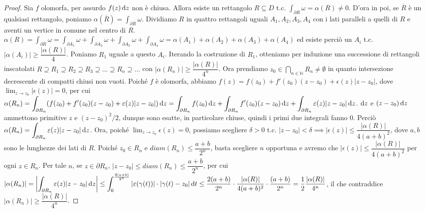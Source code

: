 \begin{proof}
  Sia $f$ olomorfa, per assurdo $f(z)\mathop{}\!\mathrm{d} z$ non è chiusa. Allora esiste un rettangolo $R \subseteq D$ t.c. $\displaystyle \int_{\partial R} \omega=\alpha(R)\not=0$. D'ora in poi, se $\overline{R}$ è un qualsiasi rettangolo, poniamo $\alpha(\overline{R})=\int_{\partial \overline{R}} \omega$. Dividiamo $R$ in quattro rettangoli uguali $A_1, A_2, A_3, A_4$ con i lati paralleli a quelli di $R$ e aventi un vertice in comune nel centro di $R$.
  $\displaystyle \alpha(R)=\int_{\partial R} \omega=\int_{\partial A_1} \omega+\int_{\partial A_2} \omega+\int_{\partial A_3} \omega+\int_{\partial A_4} \omega=\alpha(A_1)+\alpha(A_2)+\alpha(A_3)+\alpha(A_4)$ ed esiste perciò un $A_i$ t.c. $|\alpha(A_i)|\ge \dfrac{|\alpha(R)|}{4}$.
  Poniamo $R_1$ uguale a questo $A_i$. Iterando la costruzione di $R_1$, otteniamo per induzione una successione di rettangoli inscatolati $R \supseteq R_1 \supseteq R_2 \supseteq R_3 \supseteq \dots \supseteq R_n \supseteq \dots$ con $|\alpha(R_n)|\ge \dfrac{|\alpha(R)|}{4^n}$. Ora prendiamo $\displaystyle z_0 \in \bigcap_{n \in \mathbb{N}} R_n \not=\emptyset$ in quanto intersezione decrescente di compatti chiusi non vuoti.
  Poiché $f$ è olomorfa, abbiamo $f(z)=f(z_0)+f'(z_0)(z-z_0)+\epsilon(z)|z-z_0|$, dove $\displaystyle \lim_{z \longrightarrow z_0} |\epsilon(z)|=0$, per cui $\displaystyle \alpha(R_n)=\int_{\partial R_n} (f(z_0)+f'(z_0)(z-z_0)+\varepsilon(z)|z-z_0|)\mathop{}\!\mathrm{d} z=\int_{\partial R_n} f(z_0)\mathop{}\!\mathrm{d} z+\int_{\partial R_n} f'(z_0)(z-z_0)\mathop{}\!\mathrm{d} z+\int_{\partial R_n} \varepsilon(z)|z-z_0|\mathop{}\!\mathrm{d} z$.
  $\mathop{}\!\mathrm{d} z$ e $(z-z_0)\mathop{}\!\mathrm{d} z$ ammettono primitive $z$ e $(z-z_0)^2/2$, dunque sono esatte, in particolare chiuse, quindi i primi due integrali fanno $0$. Perciò $\displaystyle \alpha(R_n)=\int_{\partial R_n} \varepsilon(z)|z-z_0|\mathop{}\!\mathrm{d} z$.
  Ora, poiché $\displaystyle \lim_{z \longrightarrow z_0} \epsilon(z)=0$, possiamo scegliere $\delta>0$ t.c. $|z-z_0|<\delta \implies |\epsilon(z)|\le \dfrac{|\alpha(R)|}{4(a+b)^2}$, dove $a, b$ sono le lunghezze dei lati di $R$.
  Poiché $z_0 \in R_n$ e $diam(R_n) \le \dfrac{a+b}{2^n}$, basta scegliere $n$ opportuna e avremo che $|\epsilon(z)|\le \dfrac{|\alpha(R)|}{4(a+b)^2}$ per ogni $z \in R_n$.
  Per tale $n$, se $z \in \partial R_n$, $|z-z_0| \le diam(R_n) \le \dfrac{a+b}{2^n}$, per cui $\displaystyle |\alpha(R_n)|=\left|\int_{\partial R_n} \varepsilon(z)|z-z_0|\mathop{}\!\mathrm{d} z\right|\le\int_0^{\frac{2(a+b)}{2^n}} |\varepsilon(\gamma(t))|\cdot|\gamma(t)-z_0|\mathop{}\!\mathrm{d} t \le \dfrac{2(a+b)}{2^n}\cdot\dfrac{|\alpha(R)|}{4(a+b)^2}\cdot\dfrac{(a+b)}{2^n}=\dfrac{1}{2}\dfrac{|\alpha(R)|}{4^n}$, il che contraddice $|\alpha(R_n)| \ge \dfrac{|\alpha(R)|}{4^n}$.
\end{proof}

